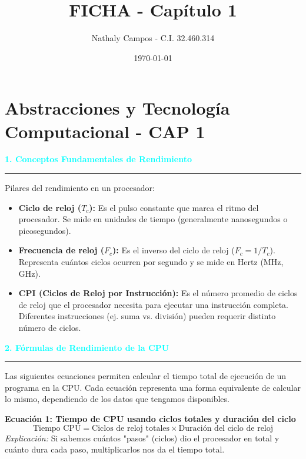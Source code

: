 \documentclass{article}
\title{FICHA - Capítulo 1}
\author{Nathaly Campos - C.I. 32.460.314}
\date{\today} %
\begin{document}
\maketitle

\section*{Abstracciones y Tecnología Computacional - CAP 1}

\vspace{0.5cm}
\noindent\textcolor{cyan}{\Large\textbf{1. Conceptos Fundamentales de Rendimiento}}
\vspace{0.2cm}\hrule\vspace{0.3cm}

Pilares del rendimiento en un procesador:
\begin{itemize}
    \item \textbf{Ciclo de reloj ($T_c$):} Es el pulso constante que marca el ritmo del procesador. Se mide en unidades de tiempo (generalmente nanosegundos o picosegundos).
    \item \textbf{Frecuencia de reloj ($F_c$):} Es el inverso del ciclo de reloj ($F_c = 1 / T_c$). Representa cuántos ciclos ocurren por segundo y se mide en Hertz (MHz, GHz).
    \item \textbf{CPI (Ciclos de Reloj por Instrucción):} Es el número promedio de ciclos de reloj que el procesador necesita para ejecutar una instrucción completa. Diferentes instrucciones (ej. suma vs. división) pueden requerir distinto número de ciclos.
\end{itemize}

\vspace{0.5cm}
\noindent\textcolor{cyan}{\Large\textbf{2. Fórmulas de Rendimiento de la CPU}}
\vspace{0.2cm}\hrule\vspace{0.3cm}

Las siguientes ecuaciones permiten calcular el tiempo total de ejecución de un programa en la CPU. Cada ecuación representa una forma equivalente de calcular lo mismo, dependiendo de los datos que tengamos disponibles.

\vspace{0.3cm}

\textbf{Ecuación 1: Tiempo de CPU usando ciclos totales y duración del ciclo}
\begin{equation}
\text{Tiempo CPU} = \text{Ciclos de reloj totales} \times \text{Duración del ciclo de reloj}
\end{equation}
\textit{Explicación:} Si sabemos cuántos "pasos" (ciclos) dio el procesador en total y cuánto dura cada paso, multiplicarlos nos da el tiempo total.
\end{document}
